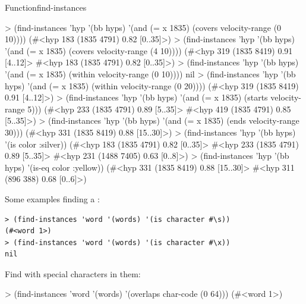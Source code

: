 \documentclass[10pt,twoside,english,pdftex]{article}
\begin{document}
\begin{functiondoc}{Function}{find-instances}
\begin{example}
> (find-instances 'hyp '(bb hyps) 
    '(and (= x 1835) (covers velocity-range (0 10))))
(#<hyp 183 (1835 4791) 0.82 [0..35]>)
> (find-instances 'hyp '(bb hyps) 
    '(and (= x 1835) (covers velocity-range (4 10))))
(#<hyp 319 (1835 8419) 0.91 [4..12]>
 #<hyp 183 (1835 4791) 0.82 [0..35]>)\goodpagebreak
> (find-instances 'hyp '(bb hyps) 
    '(and (= x 1835) (within velocity-range (0 10))))
nil
> (find-instances 'hyp '(bb hyps) 
    '(and (= x 1835) (within velocity-range (0 20))))
(#<hyp 319 (1835 8419) 0.91 [4..12]>)\goodpagebreak
> (find-instances 'hyp '(bb hyps) 
    '(and (= x 1835) (starts velocity-range 5)))
(#<hyp 233 (1835 4791) 0.89 [5..35]>
 #<hyp 419 (1835 4791) 0.85 [5..35]>)\goodpagebreak
> (find-instances 'hyp '(bb hyps) 
    '(and (= x 1835) (ends velocity-range 30)))
(#<hyp 331 (1835 8419) 0.88 [15..30]>)
> (find-instances 'hyp '(bb hyps) 
    '(is color :silver))
(#<hyp 183 (1835 4791) 0.82 [0..35]> 
 #<hyp 233 (1835 4791) 0.89 [5..35]>
 #<hyp 231 (1488 7405) 0.63 [0..8]>)
> (find-instances 'hyp '(bb hyps) 
    '(is-eq color :yellow))
(#<hyp 331 (1835 8419) 0.88 [15..30]> 
 #<hyp 311 (896 388) 0.68 [0..6]>)
\end{example}

Some examples finding a  :
%
\W\supp
\begin{verbatim}
> (find-instances 'word '(words) '(is character #\s))
(#<word 1>)
> (find-instances 'word '(words) '(is character #\x))
nil
\end{verbatim}
%
Find   with special characters in them:
%
\W\supp\notpretop
\begin{example}
> (find-instances 'word '(words) '(overlaps char-code (0 64)))
(#<word 1>)
\end{example}

\end{functiondoc}

\end{document}
